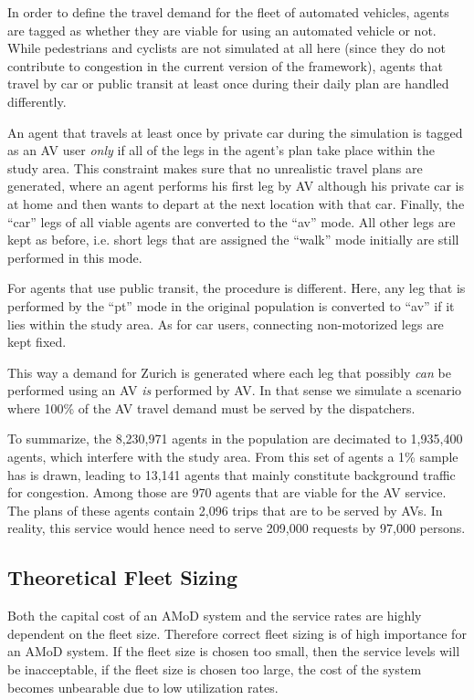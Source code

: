 In order to define the travel demand for the fleet of automated vehicles, agents
are tagged as whether they are viable for using an automated vehicle or not.
While pedestrians and cyclists are not simulated at all here (since they do not
contribute to congestion in the current version of the framework), agents that
travel by car or public transit at least once during their daily plan are
handled differently.

An agent that travels at least once by private car during the simulation is tagged
as an AV user \textit{only} if all of the legs in the agent's plan take place
within the study area. This constraint makes sure that no unrealistic travel
plans are generated, where an agent performs his first leg by AV although his
private car is at home and then wants to depart at the next location with that
car. Finally, the ``car'' legs of all viable agents are converted to the ``av'' mode.
All other legs are kept as before, i.e. short legs that are assigned the ``walk''
mode initially are still performed in this mode.

For agents that use public transit, the procedure is different. Here, any leg
that is performed by the ``pt'' mode in the original population is converted to ``av''
if it lies within the study area. As for car users, connecting non-motorized
legs are kept fixed.

This way a demand for Zurich is generated where each leg that possibly
\textit{can} be performed using an AV \textit{is} performed by AV. In that sense we
simulate a scenario where 100\% of the AV travel demand must be served by the
dispatchers.

To summarize, the 8,230,971 agents in the population are decimated to
1,935,400 agents, which interfere with the study area. From this set of agents
a 1\% sample has is drawn, leading to 13,141 agents that mainly constitute
background traffic for congestion. Among those are 970 agents that are viable for the AV
service. The plans of these agents contain 2,096 trips that are to be served by
AVs. In reality, this service would hence need to serve 209,000 requests by
97,000 persons.

\subsection{Theoretical Fleet Sizing}

Both the capital cost of an AMoD system and the service rates are highly dependent
on the fleet size. Therefore correct fleet sizing is of high importance for an
AMoD system. If the fleet size is chosen too small, then the service levels
 will be inacceptable, if the fleet size is chosen too large, the cost of the
 system becomes unbearable due to low utilization rates.

